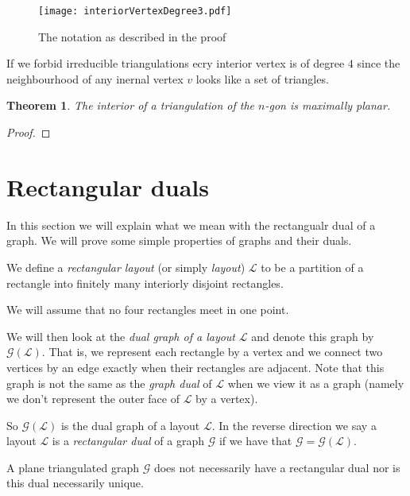 \documentclass[a4paper]{article}
\newtheorem{thrm}{Theorem}
\theoremstyle{definition}
\newcommand{\scr}[1]{\mathcal{#1}}
\begin{document}
\begin{figure}[h!]
\centering
\texttt{[image: interiorVertexDegree3.pdf]}
\caption{The notation as described in the proof \label{fig:interiorVertexDegree3}
}
\end{figure}

If we forbid irreducible triangulations ecry interior vertex is of degree $4$ since the neighbourhood of any inernal vertex $v$ looks like a set of triangles.

\begin{thrm}
The interior of a triangulation of the $n$-gon is maximally planar.
\end{thrm}

\begin{proof}
\end{proof}


\section{Rectangular duals}

\newcommand{\G}{\scr G}
\renewcommand{\L}{\scr L}

In this section we will explain what we mean with the rectangualr dual of a graph. We will prove some simple properties of graphs and their duals.

We define a \emph{rectangular layout} (or simply \emph{layout}) $\L$ to be a partition of a rectangle into finitely many interiorly disjoint rectangles. 

We will assume that no four rectangles meet in one point.

We will then look at the \emph{dual graph of a layout} $\L$ and denote this graph by $\G(\L)$. That is, we represent each rectangle by a vertex and we connect two vertices by an edge exactly when their rectangles are adjacent. Note that this graph is not the same as the \emph{graph dual} of $\L$ when we view it as a graph (namely we don't represent the outer face of $\L$ by a vertex).

So $\G(\L)$ is the dual graph of a layout $\L$. In the reverse direction we say a layout $\L$ is a \emph{rectangular dual} of a graph $\G$ if we have that $\G = \G (\L)$.

A plane triangulated graph $\G$ does not necessarily have a rectangular dual nor is this dual necessarily unique.

\end{document}
